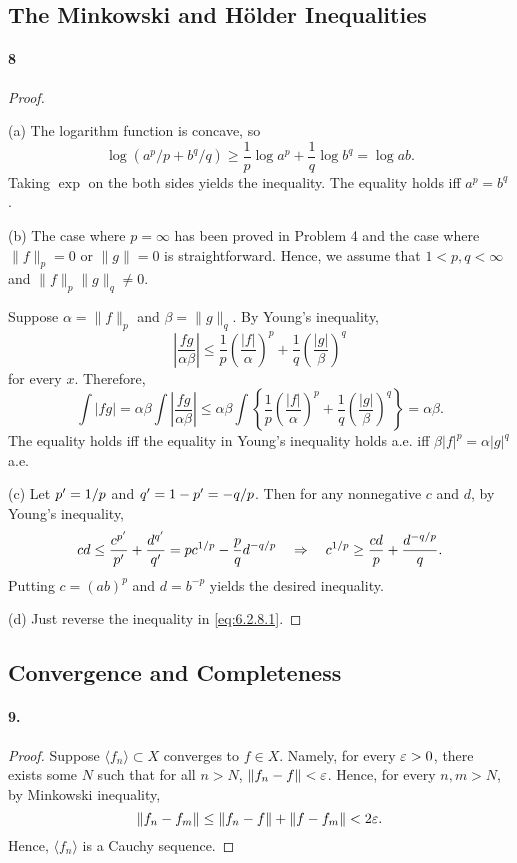 \subsection{The Minkowski and Hölder Inequalities}
  \paragraph{8}
  \begin{proof}
    $\,$\par
    (a) The logarithm function is concave, so 
    \[
      \log(a^p/p+b^q/q) \ge \frac{1}{p}\log a^p + \frac{1}{q}\log b^q = \log ab.
    \]
    Taking $\exp$ on the both sides yields the inequality. The equality holds 
    iff $a^p=b^q$. \par
    (b) The case where $p=\infty$ has been proved in Problem 4 and the case 
    where $\|f\|_p=0$ or $\|g\|=0$ is straightforward. Hence, we assume that 
    $1<p,q<\infty$ and $\|f\|_p\|g\|_q\ne 0$. \par
    Suppose $\alpha=\|f\|_p$ and $\beta=\|g\|_q$. By Young's inequality, 
    \[
      \left|\frac{fg}{\alpha\beta}\right| \le 
      \frac{1}{p}\left(\frac{|f|}{\alpha}\right)^p + 
      \frac{1}{q}\left(\frac{|g|}{\beta}\right)^q
    \]
    for every $x$. Therefore,
    \begin{equation}
      \label{eq:6.2.8.1}
      \int|fg| = \alpha\beta\int\left|\frac{fg}{\alpha\beta}\right|
      \le \alpha\beta\int\left\{\frac{1}{p}\left(\frac{|f|}{\alpha}\right)^p + 
      \frac{1}{q}\left(\frac{|g|}{\beta}\right)^q\right\}
      = \alpha\beta.
    \end{equation}
    The equality holds iff the equality in Young's inequality holds a.e. iff 
    $\beta|f|^p = \alpha|g|^q$ a.e.\par
    (c) Let $p^\prime=1/p$ and $q^\prime=1-p^\prime=-q/p$. Then for any nonnegative $c$ and
    $d$, by Young's inequality,
    \[
      cd \le \frac{c^{p^\prime}}{p^\prime}+\frac{d^{q^\prime}}{q^\prime}=
      pc^{1/p} - \frac{p}{q}d^{-q/p} \quad\Rightarrow\quad
      c^{1/p} \ge \frac{cd}{p} + \frac{d^{-q/p}}{q}.
    \]
    Putting $c=(ab)^p$ and $d=b^{-p}$ yields the desired inequality.\par
    (d) Just reverse the inequality in \eqref{eq:6.2.8.1}.
  \end{proof}

\subsection{Convergence and Completeness}
  \paragraph{9.}
  \begin{proof}
    Suppose $\langle f_n\rangle\subset X$ converges to $f\in X$. Namely, for
    every $\varepsilon>0$, there exists some $N$ such that for all $n>N$, $\|f_n-f\|<
    \varepsilon$. Hence, for every $n,m>N$, by Minkowski inequality,
    \[
      \|f_n-f_m\| \le \|f_n-f\|+\|f-f_m\| < 2\varepsilon.
    \]
    Hence, $\langle f_n\rangle$ is a Cauchy sequence.
  \end{proof}

